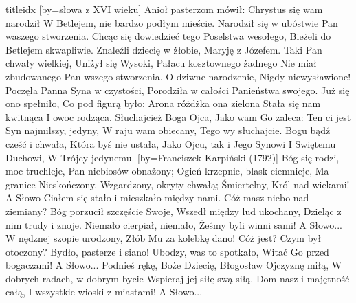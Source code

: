 \documentclass[a5paper, portrait, 12pt]{mwart}
\begin{document}
\begin{songs}{titleidx}
[by={słowa z XVI wieku}]
\beginverse
    Anioł pasterzom mówił:
    Chrystus się wam narodził
    W Betlejem, nie bardzo podłym mieście.
    Narodził się w ubóstwie
    Pan waszego stworzenia.
\endverse
\beginverse
    Chcąc się dowiedzieć tego
    Poselstwa wesołego,
    Bieżeli do Betlejem skwapliwie.
    Znaleźli dziecię w żłobie,
    Maryję z Józefem.
\endverse
\beginverse
    Taki Pan chwały wielkiej,
    Uniżył się Wysoki,
    Pałacu kosztownego żadnego
    Nie miał zbudowanego
    Pan wszego stworzenia.
\endverse
\beginverse
    O dziwne narodzenie,
    Nigdy niewysławione!
    Poczęła Panna Syna w czystości,
    Porodziła w całości
    Panieństwa swojego.
\endverse
\beginverse
    Już się ono spełniło,
    Co pod figurą było:
    Arona różdżka ona zielona
    Stała się nam kwitnąca
    I owoc rodząca.
\endverse
\beginverse
    Słuchajcież Boga Ojca,
    Jako wam Go zaleca:
    Ten ci jest Syn najmilszy, jedyny,
    W raju wam obiecany,
    Tego wy słuchajcie.
\endverse
\beginverse
    Bogu bądź cześć i chwała,
    Która byś nie ustała,
    Jako Ojcu, tak i Jego Synowi
    I Swiętemu Duchowi,
    W Trójcy jedynemu.
\endverse
\endsong
[by={Franciszek Karpiński (1792)}]
\beginverse
    Bóg się rodzi, moc truchleje,
    Pan niebiosów obnażony;
    Ogień krzepnie, blask ciemnieje,
    Ma granice Nieskończony.
    Wzgardzony, okryty chwałą;
    Śmiertelny, Król nad wiekami!
\endverse
\beginchorus
	A Słowo Ciałem się stało
	i mieszkało między nami.
\endchorus
\beginverse
    Cóż masz niebo nad ziemiany?
    Bóg porzucił szczęście Swoje,
    Wszedł między lud ukochany,
    Dzieląc z nim trudy i znoje.
    Niemało cierpiał, niemało,
    Żeśmy byli winni sami!
\endverse
\beginchorus
	A Słowo...
\endchorus
\beginverse
    W nędznej szopie urodzony,
    Żłób Mu za kolebkę dano!
    Cóż jest? Czym był otoczony?
    Bydło, pasterze i siano!
    Ubodzy, was to spotkało,
    Witać Go przed bogaczami!
\endverse
\beginchorus
	A Słowo...
\endchorus
\beginverse
    Podnieś rękę, Boże Dziecię,
    Błogosław Ojczyznę miłą,
    W dobrych radach, w dobrym bycie
    Wspieraj jej siłę swą siłą.
    Dom nasz i majętność całą,
    I wszystkie wioski z miastami!
\endverse
\beginchorus
	A Słowo...
\endchorus
\endsong


\end{songs}
\end{document}
